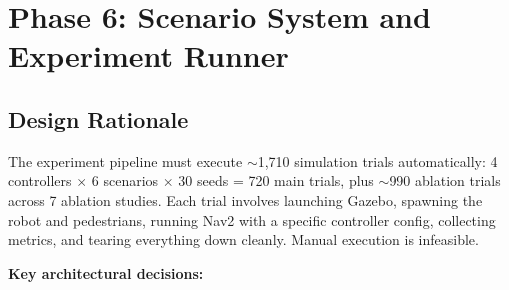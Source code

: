 \documentclass[11pt]{article}
\begin{document}

\section*{Phase 6: Scenario System and Experiment Runner}

\subsection*{Design Rationale}

The experiment pipeline must execute $\sim$1,710 simulation trials automatically:
4 controllers $\times$ 6 scenarios $\times$ 30 seeds = 720 main trials, plus
$\sim$990 ablation trials across 7 ablation studies. Each trial involves
launching Gazebo, spawning the robot and pedestrians, running Nav2 with a
specific controller config, collecting metrics, and tearing everything down
cleanly. Manual execution is infeasible.

\textbf{Key architectural decisions:}
\end{document}
